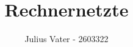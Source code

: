 \documentclass{kit}
\author{Julius Vater - 2603322}
\title{Rechnernetzte}
\begin{document}
\maketitle
\tableofcontents
\pagebreak











\end{document}
